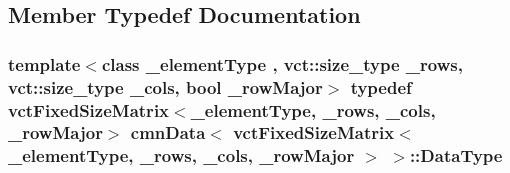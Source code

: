 \subsection{Member Typedef Documentation}
\hypertarget{classcmn_data_3_01vct_fixed_size_matrix_3_01__element_type_00_01__rows_00_01__cols_00_01__row_major_01_4_01_4_a6b06110fd1bb7049b72ce21275dd8aee}{}
\subsubsection[{Data\+Type}]{\setlength{\rightskip}{0pt plus 5cm}template$<$class \+\_\+element\+Type , vct\+::size\+\_\+type \+\_\+rows, vct\+::size\+\_\+type \+\_\+cols, bool \+\_\+row\+Major$>$ typedef {\bf vct\+Fixed\+Size\+Matrix}$<$\+\_\+element\+Type, \+\_\+rows, \+\_\+cols, \+\_\+row\+Major$>$ {\bf cmn\+Data}$<$ {\bf vct\+Fixed\+Size\+Matrix}$<$ \+\_\+element\+Type, \+\_\+rows, \+\_\+cols, \+\_\+row\+Major $>$ $>$\+::{\bf Data\+Type}}\label{classcmn_data_3_01vct_fixed_size_matrix_3_01__element_type_00_01__rows_00_01__cols_00_01__row_major_01_4_01_4_a6b06110fd1bb7049b72ce21275dd8aee}


